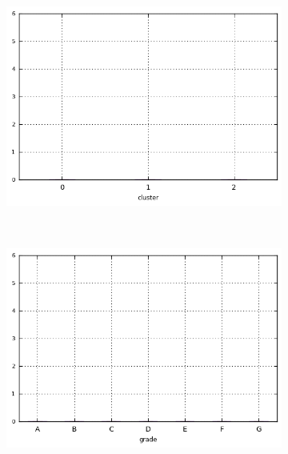 \begin{anexosenv}
\begin{figure}[t!]
\begin{subfigure}[t]{0.45\textwidth}
        \end{subfigure}
\end{figure}



\begin{figure}[ht!]
    \centering
                \caption{\emph{Boxplots} de delinq\textunderscore 2yrs}
        \begin{subfigure}[t]{0.45\textwidth}
            \centering

            \centerline{\includegraphics[width=1.05\textwidth]{img/delinq_2yrs_by_cluster}}
        \end{subfigure}%
        ~ 
        \begin{subfigure}[t]{0.45\textwidth}
            \centering
   
            \centerline{\includegraphics[width=1.05\textwidth]{img/delinq_2yrs_by_grade}}


\end{subfigure}
\end{figure}
\end{anexosenv}
